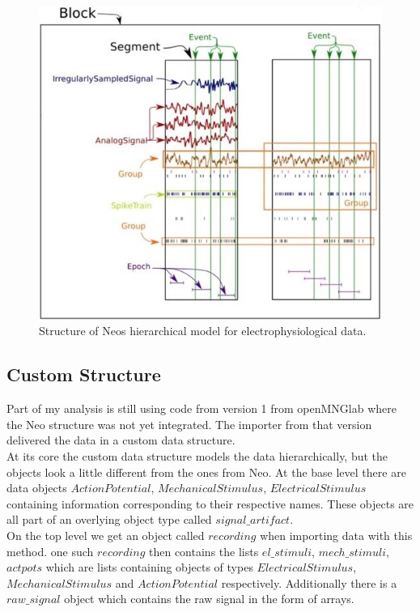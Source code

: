 \begin{figure}
	\includegraphics[width = \textwidth]{src/pic/neo_structure}
	\caption{Structure of Neos hierarchical model for electrophysiological data.}
	\label{fig:neostructure}
\end{figure}

\subsection{Custom Structure}
Part of my analysis is still using code from version 1 from openMNGlab where the Neo structure was not yet integrated. The importer from that version delivered the data in a custom data structure.\\
At its core the custom data structure models the data hierarchically, but the objects look a little different from the ones from Neo. At the base level there are data objects $ActionPotential$, $MechanicalStimulus$, $ElectricalStimulus$ containing information corresponding to their respective names. These objects are all part of an overlying object type called $signal\_artifact$.\\
On the top level we get an object called $recording$ when importing data with this method. one such $recording$ then contains the lists $el\_stimuli$, $mech\_stimuli$, $actpots$ which are lists containing objects of types $ElectricalStimulus$, $MechanicalStimulus$ and $ActionPotential$ respectively. Additionally there is a $raw\_signal$ object which contains the raw signal in the form of arrays.

